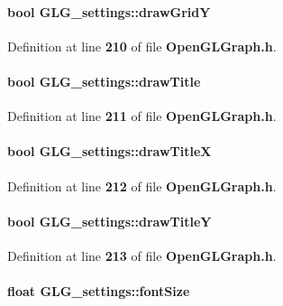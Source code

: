 \paragraph[{draw\+GridY}]{\setlength{\rightskip}{0pt plus 5cm}bool G\+L\+G\+\_\+settings\+::draw\+GridY}\label{structGLG__settings_a2f39d963735dd5ff185304894bda25df}


Definition at line {\bf 210} of file {\bf Open\+G\+L\+Graph.\+h}.

\paragraph[{draw\+Title}]{\setlength{\rightskip}{0pt plus 5cm}bool G\+L\+G\+\_\+settings\+::draw\+Title}\label{structGLG__settings_a9020692a1f1be2eb0095d40704cf175e}


Definition at line {\bf 211} of file {\bf Open\+G\+L\+Graph.\+h}.

\paragraph[{draw\+TitleX}]{\setlength{\rightskip}{0pt plus 5cm}bool G\+L\+G\+\_\+settings\+::draw\+TitleX}\label{structGLG__settings_a9494c32d024e38a6dc59f968f7a660eb}


Definition at line {\bf 212} of file {\bf Open\+G\+L\+Graph.\+h}.

\paragraph[{draw\+TitleY}]{\setlength{\rightskip}{0pt plus 5cm}bool G\+L\+G\+\_\+settings\+::draw\+TitleY}\label{structGLG__settings_a60e289af56075bf311547e5725e16c7f}


Definition at line {\bf 213} of file {\bf Open\+G\+L\+Graph.\+h}.

\paragraph[{font\+Size}]{\setlength{\rightskip}{0pt plus 5cm}float G\+L\+G\+\_\+settings\+::font\+Size}\label{structGLG__settings_a191d0172ac68abf8a9722f92ed9ac158}


